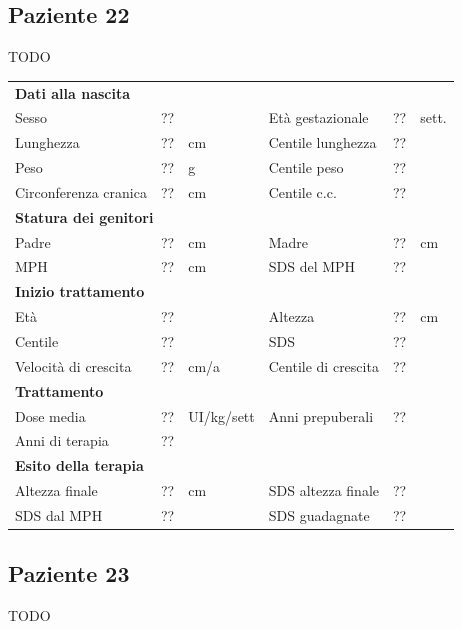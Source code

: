 \subsection*{Paziente 22}

TODO

\begin{table}[!h]
\begin{tabular}{lrllrl}
\toprule
\multicolumn{6}{l}{\textbf{Dati alla nascita}}\\
Sesso 		& \multicolumn{2}{l}{??} 	& Età gestazionale 		& ?? 		& sett.\\
Lunghezza 	& ?? 		& cm 				& Centile lunghezza		& ?? 		\\
Peso 		& ?? 		& g					& Centile peso			& ?? 		\\
Circonferenza cranica	& ?? 		& cm 	& Centile c.c.			& ?? \\
\midrule
\multicolumn{6}{l}{\textbf{Statura dei genitori}}\\
Padre 		& ?? & cm 	& Madre 				& ?? & cm \\
MPH 		& ?? & cm 	& SDS del MPH 			& ??\\
\midrule
\multicolumn{6}{l}{\textbf{Inizio trattamento}} \\
Età	& ?? & 		& Altezza 				& ?? & cm  \\
Centile & ?? 	 &		& SDS		& ?? \\
Velocità di crescita & ?? & cm/a	& Centile di crescita & ??\\
\midrule
\multicolumn{6}{l}{\textbf{Trattamento}} \\
Dose media		& ?? & UI/kg/sett & Anni prepuberali & ??\\
Anni di terapia & ??\\
\midrule
\multicolumn{6}{l}{\textbf{Esito della terapia}} \\
Altezza finale			& ?? & cm 	& SDS altezza finale		& ??\\
SDS dal MPH				& ?? &		& SDS guadagnate 			& ??\\
\bottomrule
\end{tabular}
\end{table}
\clearpage


\subsection*{Paziente 23}

TODO

